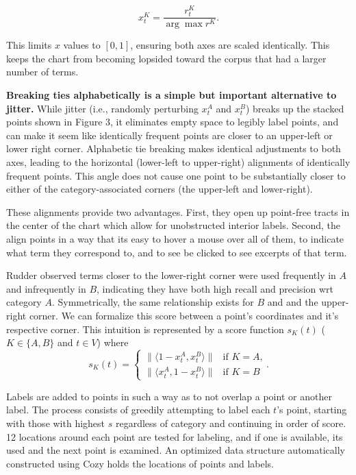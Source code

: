 \documentclass[11pt]{article}
\begin{document}
\vspace{-.2cm}
$$x^{K}_t = \frac{r^{K}_t}{\arg\!\max r^{K}}.$$
\vspace{-.2cm}

This limits $x$ values to $[0,1]$, ensuring both axes are scaled identically.  This keeps the chart from becoming lopsided toward the corpus that had a larger number of terms. 

\textbf{Breaking ties alphabetically is a simple but important alternative to jitter.} While jitter (i.e., randomly perturbing $x_{t}^{A}$ and $x_{t}^{B}$) breaks up the stacked points shown in Figure 3, it eliminates empty space to legibly label points, and can make it seem like identically frequent points are closer to an upper-left or lower right corner.  Alphabetic tie breaking makes identical adjustments to both axes, leading to the horizontal (lower-left to upper-right) alignments of identically frequent points.  This angle does not cause one point to be substantially closer to either of the category-associated corners (the upper-left and lower-right). 

These alignments provide two advantages. First, they open up point-free tracts in the center of the chart which allow for unobstructed interior labels. Second, the align points in a way that its easy to hover a mouse over all of them, to indicate what term they correspond to, and to see be clicked to see excerpts of that term.

Rudder  observed terms closer to the lower-right corner were used frequently in $A$ and infrequently in $B$, indicating they have both high recall and precision wrt category $A$.  Symmetrically, the same relationship exists for $B$ and and the upper-right corner.  We can formalize this score between a point's coordinates and it's respective corner.  This intuition is represented by a score function $s_K(t)$ ($K\in\{A,B\}$ and $t\in V$) where
\vspace{-.3cm}
\begin{equation}
s_K(t)= 
\begin{cases} \|\langle 1-x_{t}^{A}, x_{t}^{B}\rangle\| & \text{if $K=A$,}
\\
\|\langle x_{t}^{A}, 1-x_{t}^{B}\rangle\| &\text{if $K=B$}
\end{cases}.
  \label{eqn:cornerscore}
\end{equation}

Labels are added to points in such a way as to not overlap a point or another label.  The process consists of greedily attempting to label each $t$'s point, starting with those with highest $s$ regardless of category and continuing in order of score.  12 locations around each point are tested for labeling, and if one is available, its used and the next point is examined.  An optimized data structure automatically constructed using Cozy \cite{cozy} holds the locations of points and labels. 
\end{document}
